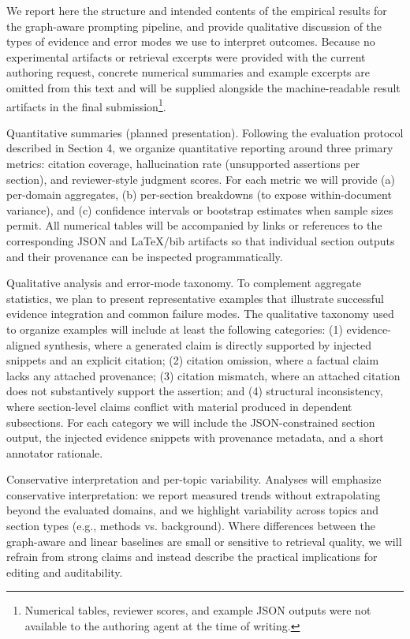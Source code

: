 We report here the structure and intended contents of the empirical results for the graph-aware prompting pipeline, and provide qualitative discussion of the types of evidence and error modes we use to interpret outcomes. Because no experimental artifacts or retrieval excerpts were provided with the current authoring request, concrete numerical summaries and example excerpts are omitted from this text and will be supplied alongside the machine-readable result artifacts in the final submission\footnote{Numerical tables, reviewer scores, and example JSON outputs were not available to the authoring agent at the time of writing.}.

Quantitative summaries (planned presentation). Following the evaluation protocol described in Section 4, we organize quantitative reporting around three primary metrics: citation coverage, hallucination rate (unsupported assertions per section), and reviewer-style judgment scores. For each metric we will provide (a) per-domain aggregates, (b) per-section breakdowns (to expose within-document variance), and (c) confidence intervals or bootstrap estimates when sample sizes permit. All numerical tables will be accompanied by links or references to the corresponding JSON and LaTeX/bib artifacts so that individual section outputs and their provenance can be inspected programmatically.

Qualitative analysis and error-mode taxonomy. To complement aggregate statistics, we plan to present representative examples that illustrate successful evidence integration and common failure modes. The qualitative taxonomy used to organize examples will include at least the following categories: (1) evidence-aligned synthesis, where a generated claim is directly supported by injected snippets and an explicit citation; (2) citation omission, where a factual claim lacks any attached provenance; (3) citation mismatch, where an attached citation does not substantively support the assertion; and (4) structural inconsistency, where section-level claims conflict with material produced in dependent subsections. For each category we will include the JSON-constrained section output, the injected evidence snippets with provenance metadata, and a short annotator rationale.

Conservative interpretation and per-topic variability. Analyses will emphasize conservative interpretation: we report measured trends without extrapolating beyond the evaluated domains, and we highlight variability across topics and section types (e.g., methods vs. background). Where differences between the graph-aware and linear baselines are small or sensitive to retrieval quality, we will refrain from strong claims and instead describe the practical implications for editing and auditability.

